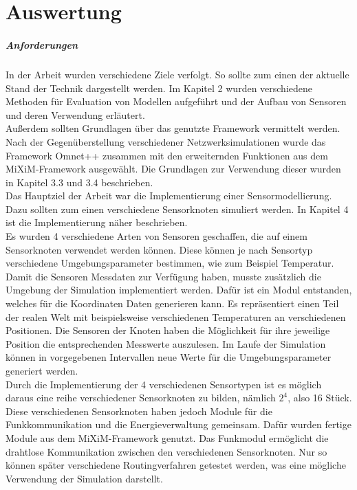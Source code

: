 \chapter{Auswertung}

\paragraph{Anforderungen} In der Arbeit wurden verschiedene Ziele verfolgt. So sollte zum einen der aktuelle Stand der Technik dargestellt werden. Im Kapitel 2 wurden verschiedene Methoden für Evaluation von Modellen aufgeführt und der Aufbau von Sensoren und deren Verwendung erläutert.\\
Außerdem sollten Grundlagen über das genutzte Framework vermittelt werden. Nach der Gegenüberstellung verschiedener Netzwerksimulationen wurde das Framework Omnet++ zusammen mit den erweiternden Funktionen aus dem MiXiM-Framework ausgewählt. Die Grundlagen zur Verwendung dieser wurden in Kapitel 3.3 und 3.4 beschrieben.\\
Das Hauptziel der Arbeit war die Implementierung einer Sensormodellierung. Dazu sollten zum einen verschiedene Sensorknoten simuliert werden. In Kapitel 4 ist die Implementierung näher beschrieben. \\
Es wurden 4 verschiedene Arten von Sensoren geschaffen, die auf einem Sensorknoten verwendet werden können. Diese können je nach Sensortyp verschiedene Umgebungsparameter bestimmen, wie zum Beispiel Temperatur. Damit die Sensoren Messdaten zur Verfügung haben, musste zusätzlich die Umgebung der Simulation implementiert werden. Dafür ist ein Modul entstanden, welches für die Koordinaten Daten generieren kann. Es repräsentiert einen Teil der realen Welt mit beispielsweise verschiedenen Temperaturen an verschiedenen Positionen. Die Sensoren der Knoten haben die Möglichkeit für ihre jeweilige Position die entsprechenden Messwerte auszulesen. Im Laufe der Simulation können in vorgegebenen Intervallen neue Werte für die Umgebungsparameter generiert werden.\\
Durch die Implementierung der 4 verschiedenen Sensortypen ist es möglich daraus eine reihe verschiedener Sensorknoten zu bilden, nämlich $2^4$, also 16 Stück. Diese verschiedenen Sensorknoten haben jedoch Module für die Funkkommunikation und die Energieverwaltung gemeinsam. Dafür wurden fertige Module aus dem MiXiM-Framework genutzt. Das Funkmodul ermöglicht die drahtlose Kommunikation zwischen den verschiedenen Sensorknoten. Nur so können später verschiedene Routingverfahren getestet werden, was eine mögliche Verwendung der Simulation darstellt.\\
